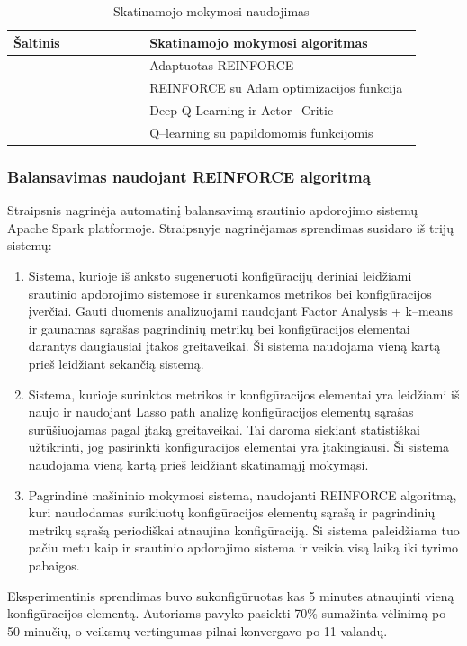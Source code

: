 \documentclass{VUMIFPSbakalaurinis}
\begin{document}
\begin{longtable}{|p{0.3\linewidth}|p{0.6\linewidth}|}
    \caption{Skatinamojo mokymosi naudojimas}
    \label{ml–usage}\\
    \hline
    \rowcolor[HTML]{C0C0C0} 
    Šaltinis                         & Skatinamojo mokymosi algoritmas    \\ \hline
    \cite{vaquero2018autotuning}     & Adaptuotas REINFORCE \cite{williams1992simple}        \\ \hline
    \cite{ni2019generalizable}       & REINFORCE \cite{williams1992simple}  su Adam optimizacijos funkcija \cite{kingma2014adam}     \\ \hline
    \cite{Li2018Model}               & Deep Q Learning \cite{mnih2015human} ir Actor−Critic \cite{lillicrap2015continuous} \\ \hline
    \cite{Russo2019Reinforcement}    & Q–learning \cite{mnih2015human} su papildomomis funkcijomis \\ \hline
\end{longtable}

\subsubsection{Balansavimas naudojant REINFORCE algoritmą}
Straipsnis \cite{vaquero2018autotuning} nagrinėja automatinį balansavimą srautinio apdorojimo sistemų Apache Spark platformoje. Straipsnyje nagrinėjamas sprendimas susidaro iš trijų sistemų:
\begin{enumerate}
    \item Sistema, kurioje iš anksto sugeneruoti konfigūracijų deriniai leidžiami srautinio apdorojimo sistemose ir surenkamos metrikos bei konfigūracijos įverčiai. Gauti duomenis analizuojami naudojant Factor Analysis + k–means ir gaunamas sąrašas pagrindinių metrikų bei konfigūracijos elementai darantys daugiausiai įtakos greitaveikai. Ši sistema naudojama vieną kartą prieš leidžiant sekančią sistemą. 
    \item Sistema, kurioje surinktos metrikos ir konfigūracijos elementai yra leidžiami iš naujo ir naudojant Lasso path analizę konfigūracijos elementų sąrašas surūšiuojamas pagal įtaką greitaveikai. Tai daroma siekiant statistiškai užtikrinti, jog pasirinkti konfigūracijos elementai yra įtakingiausi. Ši sistema naudojama vieną kartą prieš leidžiant skatinamąjį mokymąsi.
    \item Pagrindinė mašininio mokymosi sistema, naudojanti REINFORCE algoritmą, kuri naudodamas surikiuotų konfigūracijos elementų sąrašą ir pagrindinių metrikų sąrašą periodiškai atnaujina konfigūraciją. Ši sistema paleidžiama tuo pačiu metu kaip ir srautinio apdorojimo sistema ir veikia visą laiką iki tyrimo pabaigos.
\end{enumerate}  
Eksperimentinis sprendimas buvo sukonfigūruotas kas 5 minutes atnaujinti vieną konfigūracijos elementą. Autoriams pavyko pasiekti 70\% sumažinta vėlinimą po 50 minučių, o veiksmų vertingumas pilnai konvergavo po 11 valandų.
\end{document}
